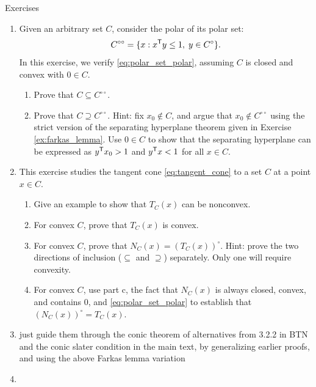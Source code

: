 \begin{xcb}{Exercises}
\begin{enumerate}[label=\thechapter.\arabic*]
\item \label{ex:polar_set_polar}
  Given an arbitrary set $C$, consider the polar of its polar set:
  \[
  C^{\circ\circ} = \{ x : x^{\mathsf{T}} y \leq 1, \; y \in C^\circ \}.
  \]
  In this exercise, we verify \eqref{eq:polar_set_polar}, assuming $C$ is closed
  and convex with $0 \in C$.
  
\begin{enumerate}[label=\alph*.] 
\item Prove that $C \subseteq C^{\circ\circ}$.
\item Prove that $C \supseteq C^{\circ\circ}$. Hint: fix $x_0 \notin C$, and
  argue that $x_0 \notin C^{\circ\circ}$ using the strict version of the
  separating hyperplane theorem given in Exercise \ref{ex:farkas_lemma}. Use $0
  \in C$ to show that the separating hyperplane can be expressed as $y^{\mathsf{T}} x_0 >
  1$ and $y^{\mathsf{T}} x < 1$ for all $x \in C$.
\end{enumerate}

\item \label{ex:tangent_cone}
  This exercise studies the tangent cone \eqref{eq:tangent_cone} to a set $C$ at
  a point $x \in C$. 


\begin{enumerate}[label=\alph*.] 
\item Give an example to show that $T_C(x)$ can be nonconvex.
\item For convex $C$, prove that $T_C(x)$ is convex. 
\item For convex $C$, prove that $N_C(x) = (T_C(x))^\circ$. Hint: prove the two  
  directions of inclusion ($\subseteq$ and $\supseteq$) separately. Only one 
  will require convexity.     
\item For convex $C$, use part c, the fact that $N_C(x)$ is always closed,
  convex, and contains 0, and \eqref{eq:polar_set_polar} to establish that
  $(N_C(x))^\circ = T_C(x)$.     
\end{enumerate}

\item \label{ex:convex_theorem_alternatives_conic}
  just guide them through the conic theorem of alternatives from 3.2.2 in BTN
  and the conic slater condition in the main text, by generalizing earlier
  proofs, and using the above Farkas lemma variation

\item \label{ex:trace_norm_semidefinite} 
  




\end{enumerate}
\end{xcb}
